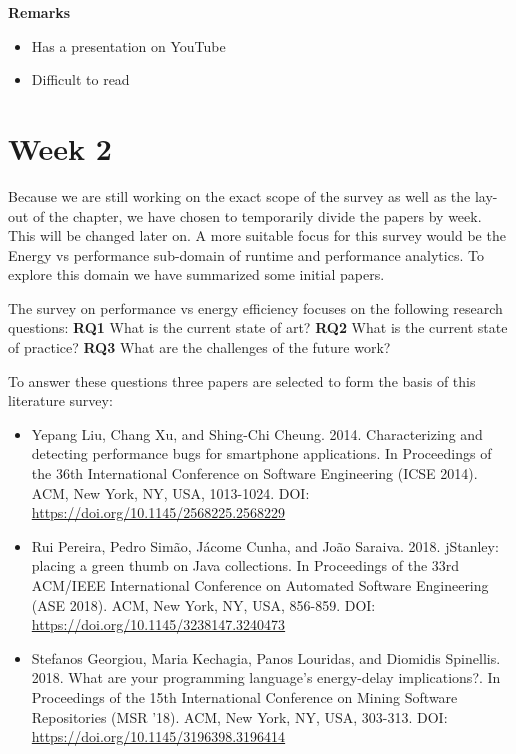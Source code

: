 \documentclass[]{book}
\providecommand{\tightlist}{%
  \setlength{\itemsep}{0pt}\setlength{\parskip}{0pt}}
\begin{document}
\textbf{Remarks}

\begin{itemize}
\tightlist
\item
  Has a presentation on YouTube
\item
  Difficult to read
\end{itemize}

\section{Week 2}\label{week-2}

Because we are still working on the exact scope of the survey as well as
the lay-out of the chapter, we have chosen to temporarily divide the
papers by week. This will be changed later on. A more suitable focus for
this survey would be the Energy vs performance sub-domain of runtime and
performance analytics. To explore this domain we have summarized some
initial papers.

The survey on performance vs energy efficiency focuses on the following
research questions: \textbf{RQ1} What is the current state of art?
\textbf{RQ2} What is the current state of practice? \textbf{RQ3} What
are the challenges of the future work?

To answer these questions three papers are selected to form the basis of
this literature survey:

\begin{itemize}
\item
  Yepang Liu, Chang Xu, and Shing-Chi Cheung. 2014. Characterizing and
  detecting performance bugs for smartphone applications. In Proceedings
  of the 36th International Conference on Software Engineering (ICSE
  2014). ACM, New York, NY, USA, 1013-1024. DOI:
  \url{https://doi.org/10.1145/2568225.2568229}
\item
  Rui Pereira, Pedro Simão, Jácome Cunha, and João Saraiva. 2018.
  jStanley: placing a green thumb on Java collections. In Proceedings of
  the 33rd ACM/IEEE International Conference on Automated Software
  Engineering (ASE 2018). ACM, New York, NY, USA, 856-859. DOI:
  \url{https://doi.org/10.1145/3238147.3240473}
\item
  Stefanos Georgiou, Maria Kechagia, Panos Louridas, and Diomidis
  Spinellis. 2018. What are your programming language's energy-delay
  implications?. In Proceedings of the 15th International Conference on
  Mining Software Repositories (MSR '18). ACM, New York, NY, USA,
  303-313. DOI: \url{https://doi.org/10.1145/3196398.3196414}
\end{itemize}
\end{document}
